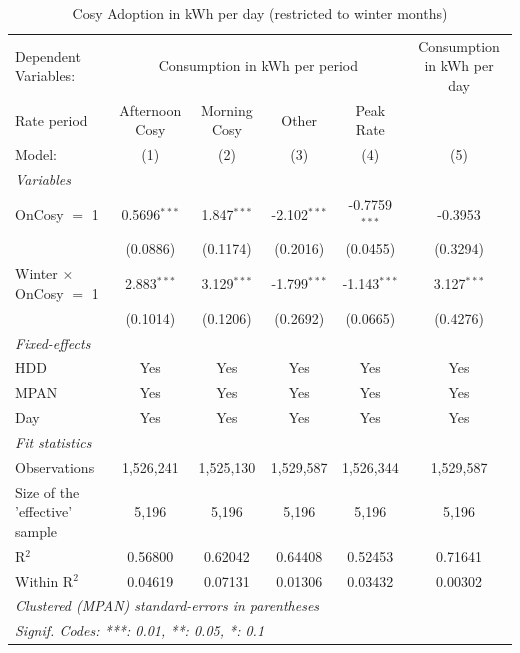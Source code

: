 
\begin{table}[htbp]
   \caption{\label{did-winter} Cosy Adoption in kWh per day (restricted to winter months)}
   \centering
   \begin{tabular}{lccccc}
      \tabularnewline \midrule \midrule
      Dependent Variables: & \multicolumn{4}{c}{Consumption in kWh per period} & Consumption in kWh per day\\
      Rate period                    & Afternoon Cosy & Morning Cosy  & Other          & Peak Rate       &  \\   
      Model:                         & (1)            & (2)           & (3)            & (4)             & (5)\\  
      \midrule
      \emph{Variables}\\
      OnCosy $=$ 1                   & 0.5696$^{***}$ & 1.847$^{***}$ & -2.102$^{***}$ & -0.7759$^{***}$ & -0.3953\\   
                                     & (0.0886)       & (0.1174)      & (0.2016)       & (0.0455)        & (0.3294)\\   
      Winter $\times$ OnCosy $=$ 1   & 2.883$^{***}$  & 3.129$^{***}$ & -1.799$^{***}$ & -1.143$^{***}$  & 3.127$^{***}$\\   
                                     & (0.1014)       & (0.1206)      & (0.2692)       & (0.0665)        & (0.4276)\\   
      \midrule
      \emph{Fixed-effects}\\
      HDD                            & Yes            & Yes           & Yes            & Yes             & Yes\\  
      MPAN                           & Yes            & Yes           & Yes            & Yes             & Yes\\  
      Day                            & Yes            & Yes           & Yes            & Yes             & Yes\\  
      \midrule
      \emph{Fit statistics}\\
      Observations                   & 1,526,241      & 1,525,130     & 1,529,587      & 1,526,344       & 1,529,587\\  
      Size of the 'effective' sample & 5,196          & 5,196         & 5,196          & 5,196           & 5,196\\  
      R$^2$                          & 0.56800        & 0.62042       & 0.64408        & 0.52453         & 0.71641\\  
      Within R$^2$                   & 0.04619        & 0.07131       & 0.01306        & 0.03432         & 0.00302\\  
      \midrule \midrule
      \multicolumn{6}{l}{\emph{Clustered (MPAN) standard-errors in parentheses}}\\
      \multicolumn{6}{l}{\emph{Signif. Codes: ***: 0.01, **: 0.05, *: 0.1}}\\
   \end{tabular}
\end{table}


